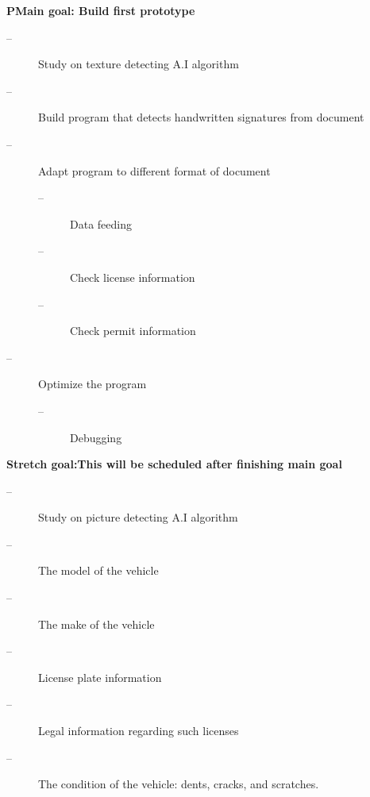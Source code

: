 \documentclass[onecolumn, draftclsnofoot,10pt, compsoc]{IEEEtran}
\begin{document}
\textbf{PMain goal: Build first prototype}
\begin{description}
	\item[--]Study on texture detecting A.I algorithm
	\item[--]Build program that detects handwritten signatures from document
	\item[--]Adapt program to different format of document
	\begin{description}
		\item[--]Data feeding
		\item[--]Check license information
		\item[--]Check permit information 
	\end{description}
	\item[--]Optimize the program
	\begin{description}
		\item[--]Debugging
	\end{description}
\end{description}

\textbf{Stretch goal:This will be scheduled after finishing main goal}
\begin{description}
	\item[--]Study on picture detecting A.I algorithm
	\item[--]The model of the vehicle
	\item[--]The make of the vehicle 
	\item[--]License plate information
	\item[--]Legal information regarding such licenses
	\item[--]The condition of the vehicle: dents, cracks, and scratches.
\end{description}
\end{document}
